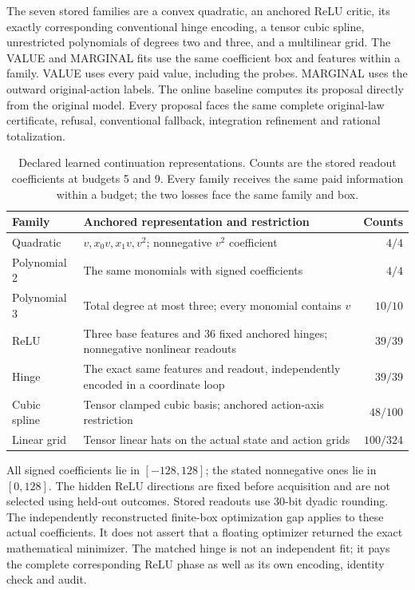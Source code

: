 The seven stored families are a convex quadratic, an anchored ReLU critic,
its exactly corresponding conventional hinge encoding, a tensor cubic
spline, unrestricted polynomials of degrees two and three, and a multilinear
grid. The VALUE and MARGINAL fits use the same coefficient box and features
within a family. VALUE uses every paid value, including the probes. MARGINAL
uses the outward original-action labels. The online baseline computes its
proposal directly from the original model. Every proposal faces the same
complete original-law certificate, refusal, conventional fallback,
integration refinement and rational totalization.

\begin{table}[t]
\centering\small
\caption{Declared learned continuation representations. Counts are the stored
readout coefficients at budgets 5 and 9. Every family receives the same paid
information within a budget; the two losses face the same family and box.}
\label{tab:representations121}
\begin{tabular}{p{}p{}r}
\toprule
Family & Anchored representation and restriction & Counts\\
\midrule
Quadratic & $v,x_0v,x_1v,v^2$; nonnegative $v^2$ coefficient & $4/4$\\
Polynomial 2 & The same monomials with signed coefficients & $4/4$\\
Polynomial 3 & Total degree at most three; every monomial contains $v$ & $10/10$\\
ReLU & Three base features and 36 fixed anchored hinges; nonnegative nonlinear readouts & $39/39$\\
Hinge & The exact same features and readout, independently encoded in a coordinate loop & $39/39$\\
Cubic spline & Tensor clamped cubic basis; anchored action-axis restriction & $48/100$\\
Linear grid & Tensor linear hats on the actual state and action grids & $100/324$\\
\bottomrule
\end{tabular}
\end{table}

All signed coefficients lie in $[-128,128]$; the stated nonnegative ones lie
in $[0,128]$. The hidden ReLU directions are fixed before acquisition and
are not selected using held-out outcomes. Stored readouts use 30-bit dyadic
rounding. The independently reconstructed finite-box optimization gap applies
to these actual coefficients. It does not assert that a floating optimizer
returned the exact mathematical minimizer. The matched hinge is not an
independent fit; it pays the complete corresponding ReLU phase as well as
its own encoding, identity check and audit.

